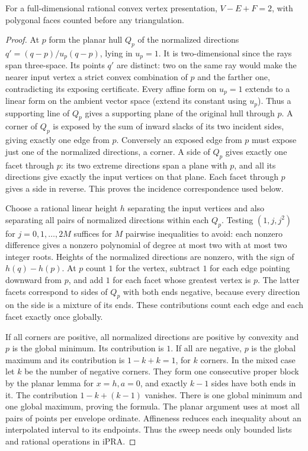 \begin{theorem}\label{idx-algebraic343}
For a full-dimensional rational convex vertex presentation,
$V-E+F=2$, with polygonal faces counted before any triangulation.
\end{theorem}
\begin{proof}
At $p$ form the planar hull $Q_p$ of the normalized directions
$q'=(q-p)/u_p(q-p)$, lying in $u_p=1$. It is two-dimensional since the
rays span three-space. Its points $q'$ are distinct: two on the same
ray would make the nearer input vertex a strict convex combination of
$p$ and the farther one, contradicting its exposing certificate.
Every affine form on $u_p=1$ extends to a linear form on the ambient
vector space (extend its constant using $u_p$). Thus a supporting line
of $Q_p$ gives a supporting plane of the original hull through $p$.
A corner of $Q_p$ is exposed by the sum of inward slacks of its two
incident sides, giving exactly one edge from $p$. Conversely an exposed
edge from $p$ must expose just one of the normalized directions, a corner.
A side of $Q_p$ gives exactly one facet through $p$: its two extreme
directions span a plane with $p$, and all its directions give exactly
the input vertices on that plane. Each facet through $p$ gives a side
in reverse. This proves the incidence correspondence used below.

Choose a rational linear height $h$ separating the input vertices and
also separating all pairs of normalized directions within each $Q_p$.
Testing $(1,j,j^2)$ for $j=0,1,\ldots,2M$ suffices for $M$ pairwise
inequalities to avoid: each nonzero difference gives a nonzero polynomial
of degree at most two with at most two integer roots. Heights of the
normalized directions are nonzero, with the sign of $h(q)-h(p)$.
At $p$ count $1$ for the vertex, subtract $1$ for each edge pointing
downward from $p$, and add $1$ for each facet whose greatest vertex is
$p$. The latter facets correspond to sides of $Q_p$ with both ends
negative, because every direction on the side is a mixture of its ends.
These contributions count each edge and each facet exactly once globally.

If all corners are positive, all normalized directions are positive by
convexity and $p$ is the global minimum. Its contribution is $1$.
If all are negative, $p$ is the global maximum and its contribution is
$1-k+k=1$, for $k$ corners. In the mixed case let $k$ be the number of
negative corners. They form one consecutive proper block by the planar
lemma for $x=h,a=0$, and exactly $k-1$ sides have both ends in it. The
contribution $1-k+(k-1)$ vanishes. There is one global minimum and one
global maximum, proving the formula. The planar argument uses at most
all pairs of points per envelope ordinate. Affineness reduces each
inequality about an interpolated interval to its endpoints. Thus the
sweep needs only bounded lists and rational operations in iPRA.
\end{proof}


